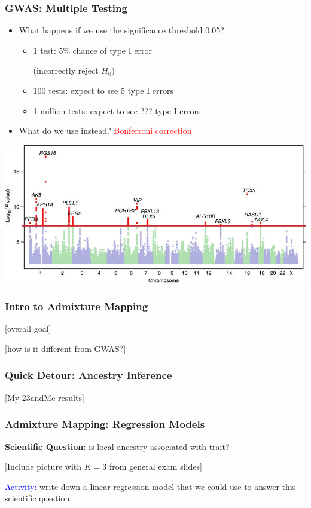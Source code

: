 \documentclass[12pt, 
hyperref={colorlinks=true, linkcolor=blue, urlcolor=cyan},dvipsnames]{beamer}
\begin{document}
\begin{frame}
\frametitle{GWAS: Multiple Testing}
\begin{itemize}
\item What happens if we use the significance threshold 0.05? \pause
	\begin{itemize}
	\item 1 test: 5\% chance of type I error \begin{footnotesize}(incorrectly reject $H_0$) \end{footnotesize} \pause
	\item 100 tests: expect to see 5 type I errors \pause
	\item 1 million tests: expect to see ??? type I errors \pause
	\end{itemize}
\item What do we use instead? \pause \textcolor{red}{Bonferroni correction} 
\end{itemize}

\includegraphics[width=\textwidth]{figs/morning_manhattan}

\end{frame}

\begin{frame}
\frametitle{Intro to Admixture Mapping}

[overall goal]

[how is it different from GWAS?]

\end{frame}

\begin{frame}
\frametitle{Quick Detour: Ancestry Inference}

[My 23andMe results]

\end{frame}


\begin{frame}
\frametitle{Admixture Mapping: Regression Models}

\textbf{Scientific Question:} is local ancestry associated with trait?

[Include picture with $K=3$ from general exam slides]

\textcolor{blue}{Activity:} write down a linear regression model that we could use to answer this scientific question.

\end{frame}
\end{document}
